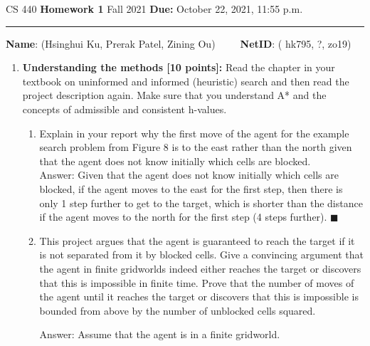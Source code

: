 \documentclass[12pt]{article}
\begin{document}
\noindent
CS 440 \hfill \textbf{Homework 1} \newline 
{Fall 2021} \hfill \textbf{Due:} October 22, 2021, 11:55 p.m.

\noindent
\rule{\linewidth}{0.4pt}

\vspace{.5cm}

\textbf{Name}: ({\color{blue}Hsinghui Ku, Prerak Patel, Zining Ou})~~~~~\textbf{NetID}: ({\color{blue} hk795, ?, zo19})

\vspace{.5cm}



\begin{enumerate}

  \item \textbf{Understanding the methods [10 points]:} Read the chapter in your textbook on uninformed and informed (heuristic) search and then read the project description again. Make sure that you understand A* and the concepts of admissible and consistent h-values.
  \begin{enumerate}
  	\item Explain in your report why the first move of the agent for the example search problem from Figure 8 is to the east rather than the north given that the agent does not know initially which cells are blocked. \\
	
	{\color{blue}Answer: 
	Given that the agent does not know initially which cells are blocked, if the agent moves to the east for the first step, then there is only 1 step further to get to the target, which is shorter than the distance if the agent moves to the north for the first step (4 steps further).
	$\blacksquare$
	\\
	}

	\item This project argues that the agent is guaranteed to reach the target if it is not separated from it by blocked cells. Give a convincing argument that the agent in finite gridworlds indeed either reaches the target or discovers that this is impossible in finite time. Prove that the number of moves of the agent until it reaches the target or discovers that this is impossible is bounded from above by the number of unblocked cells squared.\\
		
	{\color{blue}Answer: 
	Assume that the agent is in a finite gridworld.
	
}
\end{enumerate}
\end{enumerate}
\end{document}
